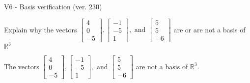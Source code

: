 \begin{exercise}
  \begin{exerciseTitle}V6 - Basis verification (ver. 230)\end{exerciseTitle}
  \begin{exerciseStatement}
    Explain why the vectors \(\left[\begin{array}{r}
4 \\
0 \\
-5
\end{array}\right] , \left[\begin{array}{r}
-1 \\
-5 \\
1
\end{array}\right] , \text{ and } \left[\begin{array}{r}
5 \\
5 \\
-6
\end{array}\right]\) are or are not a basis of \(\mathbb{R}^3\)	


  \end{exerciseStatement}
  \begin{exerciseAnswer}
   The vectors \(\left[\begin{array}{r}
4 \\
0 \\
-5
\end{array}\right] , \left[\begin{array}{r}
-1 \\
-5 \\
1
\end{array}\right] , \text{ and } \left[\begin{array}{r}
5 \\
5 \\
-6
\end{array}\right]\) 
  	 are not  a basis of \(\mathbb{R}^3\).
  


  \end{exerciseAnswer}
\end{exercise}